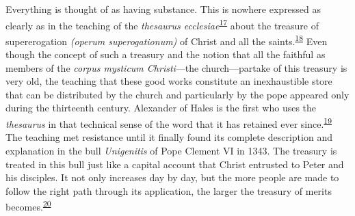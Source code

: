 Everything is thought of as having substance. This is nowhere expressed
as clearly as in the teaching of the \emph{thesaurus
ecclesiae}\textsuperscript{\protect\hypertarget{17_Chapter_Ten__THE_FAILURE_OF_IMAG.xhtmlux5cux23id_702}{\protect\hyperlink{23_NOTES.xhtmlux5cux23id_703}{17}}}
about the treasure of supererogation \emph{(operum superogationum)} of
Christ and all the
saints.\textsuperscript{\protect\hypertarget{17_Chapter_Ten__THE_FAILURE_OF_IMAG.xhtmlux5cux23id_700}{\protect\hyperlink{23_NOTES.xhtmlux5cux23id_701}{18}}}
Even though the concept of such a treasury and the notion that all the
faithful as members of the \emph{corpus mysticum Christi}---the
church---partake of this treasury is very old, the teaching that these
good works constitute an inexhaustible store that can be distributed by
the church and particularly by the pope appeared only during the
thirteenth century. Alexander of Hales is the first who uses the
\emph{thesaurus} in that technical sense of the word that it has
retained ever
since.\textsuperscript{\protect\hypertarget{17_Chapter_Ten__THE_FAILURE_OF_IMAG.xhtmlux5cux23id_698}{\protect\hyperlink{23_NOTES.xhtmlux5cux23id_699}{19}}}
The teaching met resistance until it finally found its complete
description and explanation in the bull \emph{Unigenitis} of Pope
Clement VI in 1343. The treasury is treated in this bull just like a
capital account that Christ entrusted to Peter and his disciples. It not
only increases day by day, but the more people are made to follow the
right path through its application, the larger the treasury of merits
becomes.\textsuperscript{\protect\hypertarget{17_Chapter_Ten__THE_FAILURE_OF_IMAG.xhtmlux5cux23id_696}{\protect\hyperlink{23_NOTES.xhtmlux5cux23id_697}{20}}}

